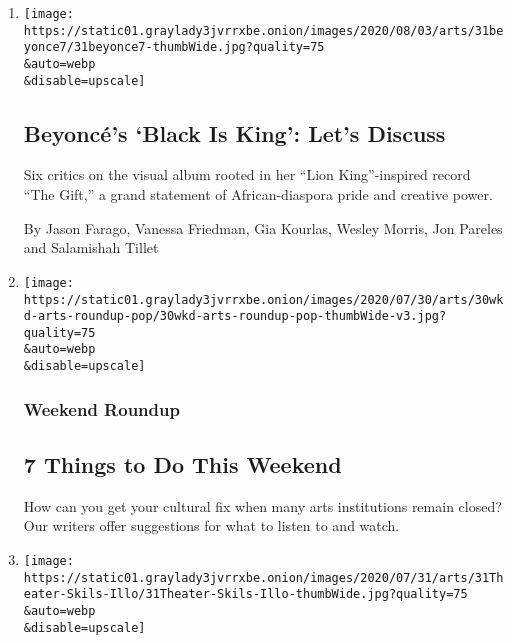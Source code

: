 \begin{enumerate}
\def\labelenumi{\arabic{enumi}.}
\item
  \href{/2020/07/31/arts/music/beyonce-black-is-king.html}{}

  \texttt{[image: https://static01.graylady3jvrrxbe.onion/images/2020/08/03/arts/31beyonce7/31beyonce7-thumbWide.jpg?quality=75\\\&auto=webp\\\&disable=upscale]}

  \hypertarget{beyoncuxe9s-black-is-king-lets-discuss}{%
  \subsection{Beyoncé's `Black Is King': Let's
  Discuss}\label{beyoncuxe9s-black-is-king-lets-discuss}}

  Six critics on the visual album rooted in her ``Lion King''-inspired
  record ``The Gift,'' a grand statement of African-diaspora pride and
  creative power.

  By Jason Farago, Vanessa Friedman, Gia Kourlas, Wesley Morris, Jon
  Pareles and Salamishah Tillet
\item
  \href{/2020/07/30/arts/things-to-do-weekend-coronavirus.html}{}

  \texttt{[image: https://static01.graylady3jvrrxbe.onion/images/2020/07/30/arts/30wkd-arts-roundup-pop/30wkd-arts-roundup-pop-thumbWide-v3.jpg?quality=75\\\&auto=webp\\\&disable=upscale]}

  \hypertarget{weekend-roundup}{%
  \subsubsection{Weekend Roundup}\label{weekend-roundup}}

  \hypertarget{7-things-to-do-this-weekend}{%
  \subsection{7 Things to Do This
  Weekend}\label{7-things-to-do-this-weekend}}

  How can you get your cultural fix when many arts institutions remain
  closed? Our writers offer suggestions for what to listen to and watch.
\item
  \href{/2020/07/30/theater/theater-classes-at-home.html}{}

  \texttt{[image: https://static01.graylady3jvrrxbe.onion/images/2020/07/31/arts/31Theater-Skils-Illo/31Theater-Skils-Illo-thumbWide.jpg?quality=75\\\&auto=webp\\\&disable=upscale]}


\end{enumerate}
